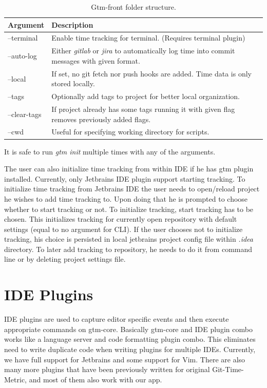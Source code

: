 \begin{table}[h]
    \centering
    \begin{tabular}{ | p{3cm} | p{10cm} |}
        \hline
        Argument & Description\\
        \hline
        --terminal & Enable time tracking for terminal. (Requires terminal plugin)\\
        \hline
        --auto-log & Either \textit{gitlab} or \textit{jira} to automatically log time
        into commit messages with given format.\\
        \hline
        --local & If set, no git fetch nor push hooks are added.
        Time data is only stored locally.\\
        \hline
        --tags & Optionally add tags to project for better local organization.\\
        \hline
        --clear-tags & If project already has some tags running it with given flag removes previously added flags.\\
        \hline
        --cwd & Useful for specifying working directory for scripts.\\
        \hline
    \end{tabular}
    \caption{Gtm-front folder structure.}
    \label{tab:gtm-init}
\end{table}
It is safe to run \textit{gtm init} multiple times with any of the arguments.

The user can also initialize time tracking from within IDE if he has gtm plugin installed.
Currently, only Jetbrains IDE plugin support starting tracking.
To initialize time tracking from Jetbrains IDE the user needs to open/reload project he wishes to add time tracking to.
Upon doing that he is prompted to choose whether to start tracking or not.
To initialize tracking, start tracking has to be chosen.
This initializes tracking for currently open repository with default settings (equal to no argument for CLI).
If the user chooses not to initialize tracking, his choice is persisted in local jetbrains project config file within \textit{.idea} directory.
To later add tracking to repository, he needs to do it from command line or by deleting project settings file.


\section{IDE Plugins}\label{sec:plugins}

IDE plugins are used to capture editor specific events and then execute appropriate commands on gtm-core.
Basically gtm-core and IDE plugin combo works like a language server and code formatting plugin combo.
This eliminates need to write duplicate code when writing plugins for multiple IDEs.
Currently, we have full support for Jetbrains and some support for Vim.
There are also many more plugins that have been previously written for original Git-Time-Metric, and most of them also work with our app.

